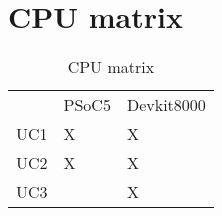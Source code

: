 \section{CPU matrix}

\begin{table}
\centering
\caption{CPU matrix}
\label{CPUmatrix}
\begin{tabular}{p{100pt} | p{100pt} | p{100 pt}}
\rowcolor{white} & PSoC5 & Devkit8000\\
\rowcolor{white}UC1 & X & X\\
\rowcolor{white}UC2 & X & X\\
\rowcolor{white}UC3 & & X\\
\end{tabular}
\end{table}